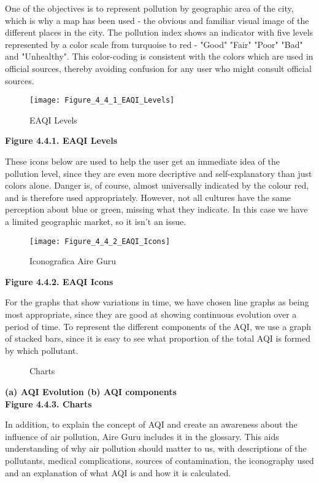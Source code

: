 One of the objectives is to represent pollution by geographic area of the city, which is why a map has been used - the 
obvious and familiar visual image of the different places in the city. The pollution index shows an indicator with 
five levels represented by a color scale from turquoise to red - "Good" "Fair" "Poor" "Bad" and "Unhealthy". 
This color-coding is consistent with the colors which are used in official sources, thereby avoiding confusion for any 
user who might consult official sources.

\begin{figure}[ht]
    \centering
    \texttt{[image: Figure\_4\_4\_1\_EAQI\_Levels]}
    \caption{EAQI Levels}
\end{figure}
\begin{center}
    \bf{        
    Figure 4.4.1. EAQI Levels}
\end{center}

These icons below are used to help the user get an immediate idea of the pollution level, since they are even more
decriptive and self-explanatory than just colors alone. Danger is, of course, almost universally indicated by 
the colour red, and is therefore used appropriately. However, not all cultures have the same perception about
blue or green, missing what they indicate. In this case we have a limited geographic market, so it isn't an issue.\\

\begin{figure}[ht]
    \centering
    \texttt{[image: Figure\_4\_4\_2\_EAQI\_Icons]}
    \caption{Iconografica Aire Guru}
\end{figure}

\begin{center}
    \bf{        
    Figure 4.4.2. EAQI Icons}
\end{center}
For the graphs that show variations in time, we have chosen line graphs as being most appropriate,
since they are good at showing continuous evolution over a period of time. To represent the different components of the AQI, we use a
graph of stacked bars, since it is easy to see what proportion of the total AQI is formed by which pollutant. \\

\begin{figure}[ht]
    \centering
        \hfill
    \caption{Charts}
\end{figure}

\begin{center}
    \bf{ (a) AQI Evolution     (b) AQI components   \\
    Figure 4.4.3. Charts}
\end{center}
In addition, to explain the concept of AQI and create an awareness about the influence of air pollution, Aire Guru includes it in the
glossary. This aids understanding of why air pollution should matter to us, with descriptions of the pollutants, medical complications, sources of contamination, the iconography used and
an explanation of what AQI is and how it is calculated. \\
